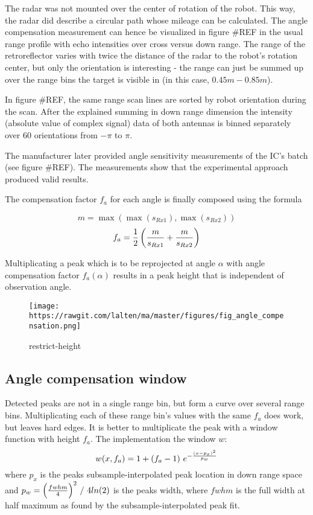 The radar was not mounted over the center of rotation of the robot. This
way, the radar did describe a circular path whose mileage can be
calculated. The angle compensation measurement can hence be visualized
in figure \#REF in the usual range profile with echo intensities over
cross versus down range. The range of the retroreflector varies with
twice the distance of the radar to the robot's rotation center, but only
the orientation is interesting - the range can just be summed up over
the range bins the target is visible in (in this case,
\(0.45m - 0.85m\)).

In figure \#REF, the same range scan lines are sorted by robot
orientation during the scan. After the explained summing in down range
dimension the intensity (absolute value of complex signal) data of both
antennas is binned separately over 60 orientations from \(-\pi\) to
\(\pi\).

The manufacturer later provided angle sensitivity measurements of the
IC's batch (see figure \#REF). The measurements show that the
experimental approach produced valid results.

The compensation factor \(f_a\) for each angle is finally composed using
the formula

\[m = \max \left( \max (s_{Rx1}), \max (s_{Rx2}) \right)\] \[
f_a = {1\over{2}}
  \left(
    {{m}\over{ s_{Rx1} }} +
    {{m}\over{ s_{Rx2} }}
  \right)
\]

Multiplicating a peak which is to be reprojected at angle \(\alpha\)
with angle compensation factor \(f_a(\alpha)\) results in a peak height
that is independent of observation angle.

\begin{figure}
\centering
\texttt{[image: https://rawgit.com/lalten/ma/master/figures/fig\_angle\_compensation.png]}
\caption{restrict-height}
\end{figure}

\subsection{Angle compensation
window}\label{angle-compensation-window}

Detected peaks are not in a single range bin, but form a curve over
several range bins. Multiplicating each of these range bin's values with
the same \(f_a\) does work, but leaves hard edges. It is better to
multiplicate the peak with a window function with height \(f_a\). The
implementation the window \(w\): \[
w(x,f_a) = 1 + (f_a - 1)
~e ^ {
 -{
    \left( {x - p_x} \right) ^ 2
    \over{ {p_w} }
  }
}
\] where \(p_x\) is the peaks subsample-interpolated peak location in
down range space and
\(p_w = { {{ \left( { {fwhm}\over{4} } \right) } ^2}~/~{4 ln(2)} }\) is
the peaks width, where \(fwhm\) is the full width at half maximum as
found by the subsample-interpolated peak fit.

